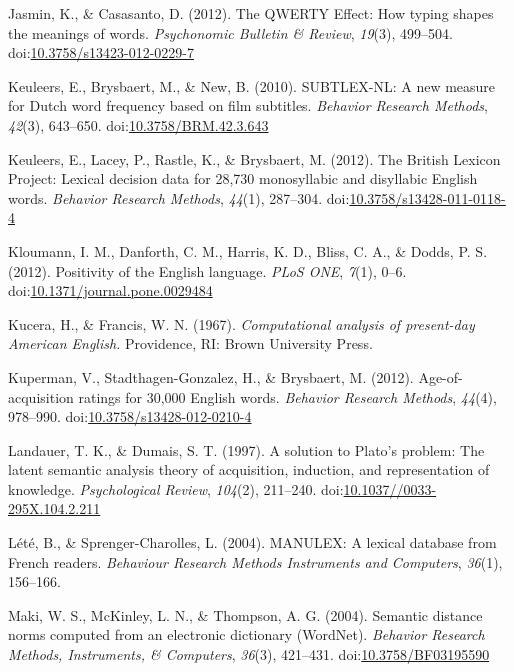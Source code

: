 \documentclass[english,man]{apa6}
\theoremstyle{definition}
\theoremstyle{definition}
\theoremstyle{definition}
\theoremstyle{remark}
\begin{document}
\hypertarget{ref-Jasmin2012}{}
Jasmin, K., \& Casasanto, D. (2012). The QWERTY Effect: How typing
shapes the meanings of words. \emph{Psychonomic Bulletin \& Review},
\emph{19}(3), 499--504.
doi:\href{https://doi.org/10.3758/s13423-012-0229-7}{10.3758/s13423-012-0229-7}

\hypertarget{ref-Keuleers2010}{}
Keuleers, E., Brysbaert, M., \& New, B. (2010). SUBTLEX-NL: A new
measure for Dutch word frequency based on film subtitles. \emph{Behavior
Research Methods}, \emph{42}(3), 643--650.
doi:\href{https://doi.org/10.3758/BRM.42.3.643}{10.3758/BRM.42.3.643}

\hypertarget{ref-Keuleers2012}{}
Keuleers, E., Lacey, P., Rastle, K., \& Brysbaert, M. (2012). The
British Lexicon Project: Lexical decision data for 28,730 monosyllabic
and disyllabic English words. \emph{Behavior Research Methods},
\emph{44}(1), 287--304.
doi:\href{https://doi.org/10.3758/s13428-011-0118-4}{10.3758/s13428-011-0118-4}

\hypertarget{ref-Kloumann2012}{}
Kloumann, I. M., Danforth, C. M., Harris, K. D., Bliss, C. A., \& Dodds,
P. S. (2012). Positivity of the English language. \emph{PLoS ONE},
\emph{7}(1), 0--6.
doi:\href{https://doi.org/10.1371/journal.pone.0029484}{10.1371/journal.pone.0029484}

\hypertarget{ref-Kucera1967}{}
Kucera, H., \& Francis, W. N. (1967). \emph{Computational analysis of
present-day American English.} Providence, RI: Brown University Press.

\hypertarget{ref-Kuperman2012}{}
Kuperman, V., Stadthagen-Gonzalez, H., \& Brysbaert, M. (2012).
Age-of-acquisition ratings for 30,000 English words. \emph{Behavior
Research Methods}, \emph{44}(4), 978--990.
doi:\href{https://doi.org/10.3758/s13428-012-0210-4}{10.3758/s13428-012-0210-4}

\hypertarget{ref-Landauer1997}{}
Landauer, T. K., \& Dumais, S. T. (1997). A solution to Plato's problem:
The latent semantic analysis theory of acquisition, induction, and
representation of knowledge. \emph{Psychological Review}, \emph{104}(2),
211--240.
doi:\href{https://doi.org/10.1037//0033-295X.104.2.211}{10.1037//0033-295X.104.2.211}

\hypertarget{ref-Lete2004}{}
Lété, B., \& Sprenger-Charolles, L. (2004). MANULEX: A lexical database
from French readers. \emph{Behaviour Research Methods Instruments and
Computers}, \emph{36}(1), 156--166.

\hypertarget{ref-Maki2004}{}
Maki, W. S., McKinley, L. N., \& Thompson, A. G. (2004). Semantic
distance norms computed from an electronic dictionary (WordNet).
\emph{Behavior Research Methods, Instruments, \& Computers},
\emph{36}(3), 421--431.
doi:\href{https://doi.org/10.3758/BF03195590}{10.3758/BF03195590}
\end{document}
